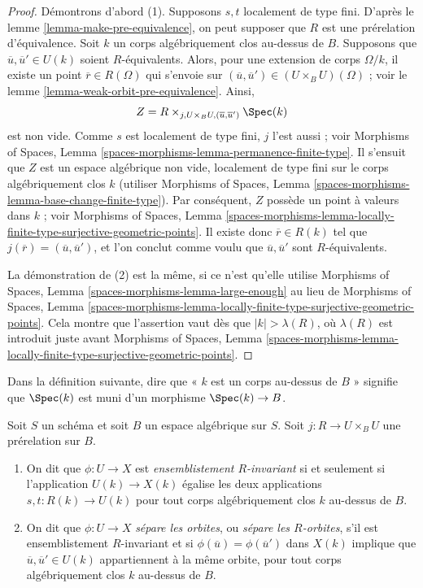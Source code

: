 \begin{proof}
Démontrons d'abord (1). Supposons $s, t$ localement de type fini. D'après le
lemme \ref{lemma-make-pre-equivalence},
on peut supposer que $R$ est une prérelation d'équivalence.
Soit $k$ un corps algébriquement clos au-dessus de $B$.
Supposons que $\overline{u}, \overline{u}' \in U(k)$ soient $R$-équivalents.
Alors, pour une extension de corps $\Omega/k$, il existe
un point $\overline{r} \in R(\Omega)$ qui s'envoie sur
$(\overline{u}, \overline{u}') \in (U \times_B U)(\Omega)$ ; voir le
lemme \ref{lemma-weak-orbit-pre-equivalence}.
Ainsi,
$$
Z = R \times_{j, U \times_B U, (\overline{u}, \overline{u}')} \Spec(k)
$$
est non vide. Comme $s$ est localement de type fini,
$j$ l'est aussi ; voir
Morphisms of Spaces, Lemma \ref{spaces-morphisms-lemma-permanence-finite-type}.
Il s'ensuit que $Z$ est un espace algébrique non vide, localement de type fini
sur le corps algébriquement clos $k$ (utiliser
Morphisms of Spaces,
Lemma \ref{spaces-morphisms-lemma-base-change-finite-type}).
Par conséquent, $Z$ possède un point à valeurs dans $k$ ; voir
Morphisms of Spaces, Lemma
\ref{spaces-morphisms-lemma-locally-finite-type-surjective-geometric-points}.
Il existe donc $\overline{r} \in R(k)$ tel que
$j(\overline{r}) = (\overline{u}, \overline{u}')$, et l'on conclut comme voulu que
$\overline{u}, \overline{u}'$ sont $R$-équivalents.

\medskip\noindent
La démonstration de (2) est la même, si ce n'est qu'elle utilise
Morphisms of Spaces, Lemma
\ref{spaces-morphisms-lemma-large-enough}
au lieu de
Morphisms of Spaces, Lemma
\ref{spaces-morphisms-lemma-locally-finite-type-surjective-geometric-points}.
Cela montre que l'assertion vaut dès que $|k| > \lambda(R)$, où
$\lambda(R)$ est introduit juste avant
Morphisms of Spaces, Lemma
\ref{spaces-morphisms-lemma-locally-finite-type-surjective-geometric-points}.
\end{proof}

\noindent
Dans la définition suivante, dire que « $k$ est un corps
au-dessus de $B$ » signifie que $\Spec(k)$ est muni d'un morphisme
$\Spec(k) \to B$.

\begin{definition}
\label{definition-set-theoretically-invariant}
Soit $S$ un schéma et soit $B$ un espace algébrique sur $S$.
Soit $j : R \to U \times_B U$ une prérelation sur $B$.
\begin{enumerate}
\item On dit que $\phi : U \to X$ est {\it ensemblistement $R$-invariant}
si et seulement si l'application $U(k) \to X(k)$ égalise les deux applications
$s, t : R(k) \to U(k)$ pour tout corps algébriquement clos $k$
au-dessus de $B$.
\item On dit que $\phi : U \to X$ {\it sépare les orbites}, ou
{\it sépare les $R$-orbites}, s'il est ensemblistement $R$-invariant et si
$\phi(\overline{u}) = \phi(\overline{u}')$ dans $X(k)$ implique que
$\overline{u}, \overline{u}' \in U(k)$ appartiennent à la même orbite,
pour tout corps algébriquement clos $k$ au-dessus de $B$.
\end{enumerate}
\end{definition}

